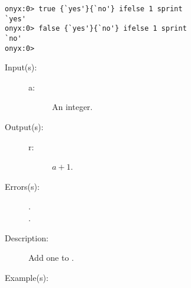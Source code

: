 \begin{description}
\begin{description}
\begin{verbatim}
onyx:0> true {`yes'}{`no'} ifelse 1 sprint
`yes'
onyx:0> false {`yes'}{`no'} ifelse 1 sprint
`no'
onyx:0>
		\end{verbatim}
	\end{description}
\label{systemdict:inc}
\item[{\onyxop{a}{inc}{r}}: ]
	\begin{description}\item[]
	\item[Input(s): ]
		\begin{description}\item[]
		\item[a: ]
			An integer.
		\end{description}
	\item[Output(s): ]
		\begin{description}\item[]
		\item[r: ]
			$a + 1$.
		\end{description}
	\item[Errors(s): ]
		\begin{description}\item[]
		\item[.]
		\item[.]
		\end{description}
	\item[Description: ]
		Add one to .
	\item[Example(s): ]\begin{verbatim}


\end{verbatim}
\end{description}
\end{description}
